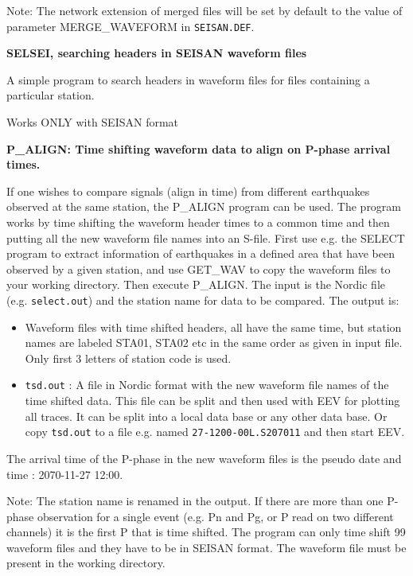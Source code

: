 Note: The network extension of merged files will be set by default 
to the value of parameter 
\newline
MERGE\_WAVEFORM in \texttt{SEISAN.DEF}. 

\textbf{SELSEI, searching headers in SEISAN waveform files}

A simple program to search headers in waveform files for files containing a particular station. 

Works ONLY with SEISAN format 

\textbf{P\_ALIGN: Time shifting waveform data to align on P-phase arrival times.}

If one wishes to compare signals (align in time) from different
earthquakes observed at the same station, the P\_ALIGN program can 
be used. The program works by time shifting the waveform header times 
to a common time and then putting all the new waveform file names 
into an S-file. First use e.g. the SELECT program to extract information 
of earthquakes in a defined area that have been observed by a given 
station, and use GET\_WAV to copy the waveform files to your working directory.
Then execute P\_ALIGN. The input is the Nordic file 
(e.g. \texttt{select.out}) and the station name for data to be compared. 
The output is: 

\begin{itemize}
\item
Waveform files with time shifted headers, all have the same time, but station names are labeled STA01, STA02 etc in the same order as given in input file. Only first 3 letters of station code is used. 
\item
\texttt{tsd.out} : A file in Nordic format with the new waveform 
file names of the time shifted data. This file can be split and 
then used with EEV for plotting all traces. It can be split into 
a local data base or any other data base. Or copy \texttt{tsd.out} 
to a file e.g. named \texttt{27-1200-00L.S207011} and then start EEV.
\end{itemize}

The arrival time of the P-phase in the new waveform files is the pseudo date and time : 2070-11-27 
12:00. 

Note: The station name is renamed in the output. If there are more than one P-phase observation for a single event (e.g. Pn and Pg, or P read on two different channels) it is the first P that is time shifted. The program can only time shift 99 waveform files and they have to be in SEISAN format. The waveform file must be present in the working directory. 

